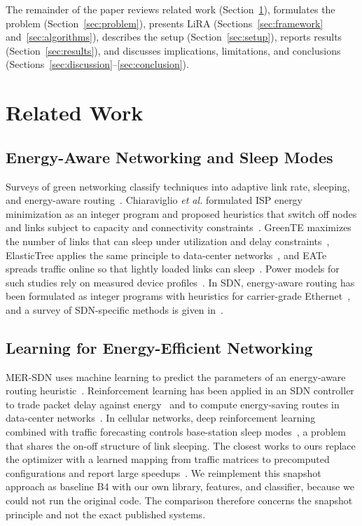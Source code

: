 \documentclass[journal]{IEEEtran}
\begin{document}
The remainder of the paper reviews related work (Section~\ref{sec:related}), formulates the problem (Section~\ref{sec:problem}), presents LiRA (Sections~\ref{sec:framework} and~\ref{sec:algorithms}), describes the setup (Section~\ref{sec:setup}), reports results (Section~\ref{sec:results}), and discusses implications, limitations, and conclusions (Sections~\ref{sec:discussion}--\ref{sec:conclusion}).

\section{Related Work}\label{sec:related}

\subsection{Energy-Aware Networking and Sleep Modes}

Surveys of green networking classify techniques into adaptive link rate, sleeping, and energy-aware routing~\cite{bianzino2012survey,bolla2011energy}. Chiaraviglio \emph{et al.} formulated ISP energy minimization as an integer program and proposed heuristics that switch off nodes and links subject to capacity and connectivity constraints~\cite{chiaraviglio2012minimizing}. GreenTE maximizes the number of links that can sleep under utilization and delay constraints~\cite{zhang2010greente}, ElasticTree applies the same principle to data-center networks~\cite{heller2010elastictree}, and EATe spreads traffic online so that lightly loaded links can sleep~\cite{vasic2010eate}. Power models for such studies rely on measured device profiles~\cite{mahadevan2009power,restrepo2009energy,vishwanath2014modeling}. In SDN, energy-aware routing has been formulated as integer programs with heuristics for carrier-grade Ethernet~\cite{maaloul2018carrier}, and a survey of SDN-specific methods is given in~\cite{assefa2019survey}.

\subsection{Learning for Energy-Efficient Networking}

MER-SDN uses machine learning to predict the parameters of an energy-aware routing heuristic~\cite{assefa2018mersdn}. Reinforcement learning has been applied in an SDN controller to trade packet delay against energy~\cite{frohlich2021rl} and to compute energy-saving routes in data-center networks~\cite{zheng2022energysaving}. In cellular networks, deep reinforcement learning combined with traffic forecasting controls base-station sleep modes~\cite{wu2021deepbsc}, a problem that shares the on-off structure of link sleeping. The closest works to ours replace the optimizer with a learned mapping from traffic matrices to precomputed configurations and report large speedups~\cite{gomezdelahiz2025noms,gomezdelahiz2026tgcn}. We reimplement this snapshot approach as baseline B4 with our own library, features, and classifier, because we could not run the original code. The comparison therefore concerns the snapshot principle and not the exact published systems.
\end{document}
